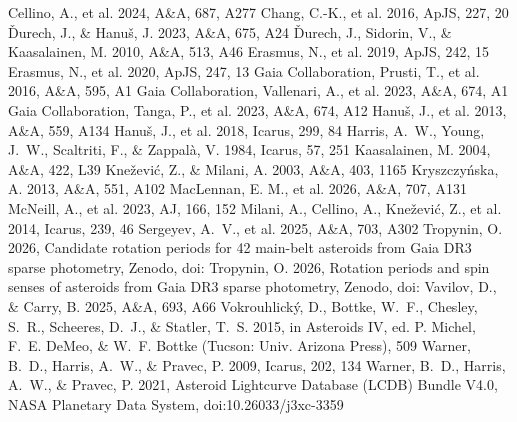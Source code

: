 \documentclass[twocolumn]{aastex631}
\begin{document}
\begin{thebibliography}{}
 Cellino, A., et al. 2024, A\&A, 687, A277
 Chang, C.-K., et al. 2016, ApJS, 227, 20
 \v{D}urech, J., \& Hanu\v{s}, J. 2023, A\&A, 675, A24
 \v{D}urech, J., Sidorin, V., \& Kaasalainen, M. 2010, A\&A, 513, A46
 Erasmus, N., et al. 2019, ApJS, 242, 15
 Erasmus, N., et al. 2020, ApJS, 247, 13
 Gaia Collaboration, Prusti, T., et al. 2016, A\&A, 595, A1
 Gaia Collaboration, Vallenari, A., et al. 2023, A\&A, 674, A1
 Gaia Collaboration, Tanga, P., et al. 2023, A\&A, 674, A12
 Hanu\v{s}, J., et al. 2013, A\&A, 559, A134
 Hanu\v{s}, J., et al. 2018, Icarus, 299, 84
 Harris, A.~W., Young, J.~W., Scaltriti, F., \& Zappal\`{a}, V. 1984, Icarus, 57, 251
 Kaasalainen, M. 2004, A\&A, 422, L39
 Kne\v{z}evi\'{c}, Z., \& Milani, A. 2003, A\&A, 403, 1165
 Kryszczy\'{n}ska, A. 2013, A\&A, 551, A102
 MacLennan, E. M., et al. 2026, A\&A, 707, A131
 McNeill, A., et al. 2023, AJ, 166, 152
 Milani, A., Cellino, A., Kne\v{z}evi\'{c}, Z., et al. 2014, Icarus, 239, 46
 Sergeyev, A.~V., et al. 2025, A\&A, 703, A302
 Tropynin, O. 2026, Candidate rotation periods for 42 main-belt asteroids from Gaia DR3 sparse photometry, Zenodo, doi:
 Tropynin, O. 2026, Rotation periods and spin senses of asteroids from Gaia DR3 sparse photometry, Zenodo, doi:
 Vavilov, D., \& Carry, B. 2025, A\&A, 693, A66
 Vokrouhlick\'{y}, D., Bottke, W.~F., Chesley, S.~R., Scheeres, D.~J., \& Statler, T.~S. 2015, in Asteroids IV, ed. P. Michel, F.~E. DeMeo, \& W.~F. Bottke (Tucson: Univ. Arizona Press), 509
 Warner, B.~D., Harris, A.~W., \& Pravec, P. 2009, Icarus, 202, 134
 Warner, B.~D., Harris, A.~W., \& Pravec, P. 2021, Asteroid Lightcurve Database (LCDB) Bundle V4.0, NASA Planetary Data System, doi:10.26033/j3xc-3359
\end{thebibliography}
\end{document}
